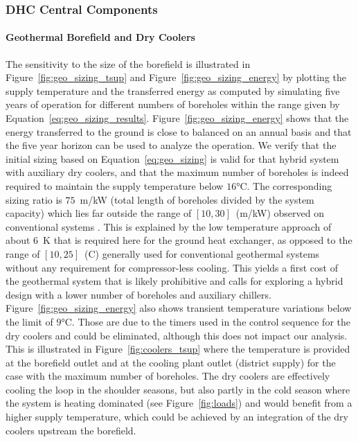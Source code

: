 \subsubsection{DHC Central Components} \label{sec:dhc}

\paragraph{Geothermal Borefield and Dry Coolers}

The sensitivity to the size of the borefield is illustrated in Figure~\ref{fig:geo_sizing_tsup} and Figure~\ref{fig:geo_sizing_energy} by plotting the supply temperature and the transferred energy as computed by simulating five years of operation for different numbers of boreholes within the range given by Equation~\ref{eq:geo_sizing_results}.
Figure~\ref{fig:geo_sizing_energy} shows that the energy transferred to the ground is close to balanced on an annual basis and that the five year horizon can be used to analyze the operation.
We verify that the initial sizing based on Equation~\ref{eq:geo_sizing} is valid for that hybrid system with auxiliary dry coolers, and that the maximum number of boreholes is indeed required to maintain the supply temperature below $16$°C.
The corresponding sizing ratio is $75$~m/kW (total length of boreholes divided by the system capacity) which lies far outside the range of $[10, 30]$~(m/kW) observed on conventional systems \citep{Kavanaugh2014}. This is explained by the low temperature approach of about $6$~K that is required here for the ground heat exchanger, as opposed to the range of $[10, 25]$~(C) generally used for conventional geothermal systems without any requirement for compressor-less cooling.
This yields a first cost of the geothermal system that is likely prohibitive and calls for exploring a hybrid design with a lower number of boreholes and auxiliary chillers.
Figure~\ref{fig:geo_sizing_energy} also shows transient temperature variations below the limit of $9$°C. Those are due to the timers used in the control sequence for the dry coolers and could be eliminated, although this does not impact our analysis. This is illustrated in Figure~\ref{fig:coolers_tsup} where the temperature is provided at the borefield outlet and at the cooling plant outlet (district supply) for the case with the maximum number of boreholes. The dry coolers are effectively cooling the loop in the shoulder seasons, but also partly in the cold season where the system is heating dominated (see Figure~\ref{fig:loads}) and would benefit from a higher supply temperature, which could be achieved by an integration of the dry coolers upstream the borefield.


